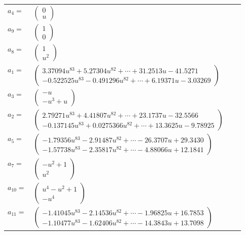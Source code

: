 \documentclass[1p]{elsarticle_modified}
\theoremstyle{definition}
\begin{document}
\begin{tabular}{m{7pt} m{180pt} m{7pt} m{180pt} }
\flushright $a_{4}=$&$\begin{pmatrix}0\\u\end{pmatrix}$ \\
\flushright $a_{9}=$&$\begin{pmatrix}1\\0\end{pmatrix}$ \\
\flushright $a_{8}=$&$\begin{pmatrix}1\\u^2\end{pmatrix}$ \\
\flushright $a_{1}=$&$\begin{pmatrix}3.37094 u^{83}+5.27304 u^{82}+\cdots+31.2513 u-41.5271\\-0.522525 u^{83}-0.491296 u^{82}+\cdots+6.19371 u-3.03269\end{pmatrix}$ \\
\flushright $a_{3}=$&$\begin{pmatrix}- u\\- u^3+u\end{pmatrix}$ \\
\flushright $a_{2}=$&$\begin{pmatrix}2.79271 u^{83}+4.41807 u^{82}+\cdots+23.1737 u-32.5566\\-0.137145 u^{83}+0.0275366 u^{82}+\cdots+13.3625 u-9.78925\end{pmatrix}$ \\
\flushright $a_{5}=$&$\begin{pmatrix}-1.79356 u^{83}-2.91487 u^{82}+\cdots-26.3707 u+29.3430\\-1.57738 u^{83}-2.35817 u^{82}+\cdots-4.88066 u+12.1841\end{pmatrix}$ \\
\flushright $a_{7}=$&$\begin{pmatrix}- u^2+1\\u^2\end{pmatrix}$ \\
\flushright $a_{10}=$&$\begin{pmatrix}u^4- u^2+1\\- u^4\end{pmatrix}$ \\
\flushright $a_{11}=$&$\begin{pmatrix}-1.41045 u^{83}-2.14536 u^{82}+\cdots-1.96825 u+16.7853\\-1.10477 u^{83}-1.62406 u^{82}+\cdots-14.3843 u+13.7098\end{pmatrix}$ \\

\end{tabular}
\end{document}
